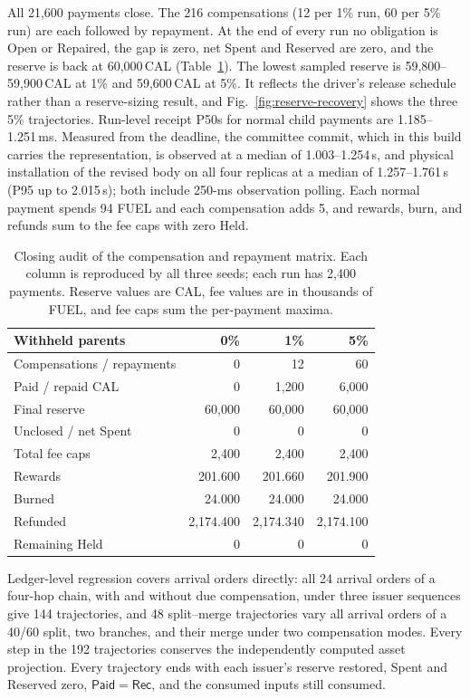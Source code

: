 All 21,600 payments close. The 216 compensations (12 per 1\% run, 60 per 5\%
run) are each followed by repayment. At the end of every run no obligation is
Open or Repaired, the gap is zero, net Spent and Reserved are zero, and the
reserve is back at 60,000\,CAL (Table~\ref{archive:tab:eval-audit}). The lowest
sampled reserve is 59,800--59,900\,CAL at 1\% and 59,600\,CAL at 5\%. It
reflects the driver's release schedule rather than a reserve-sizing result,
and Fig.~\ref{fig:reserve-recovery} shows the three 5\% trajectories. Run-level receipt P50s
for normal child payments are 1.185--1.251\,ms. Measured from the deadline, the
committee commit, which in this build carries the representation, is observed
at a median of 1.003--1.254\,s, and physical installation of the revised
body on all four replicas at a median of 1.257--1.761\,s (P95 up to 2.015\,s); both include 250-ms observation
polling. Each normal payment spends 94 FUEL and each compensation adds 5, and
rewards, burn, and refunds sum to the fee caps with zero Held.

\begin{table}[t]
  \caption{Closing audit of the compensation and repayment matrix. Each
    column is reproduced by all three seeds; each run has 2,400 payments.
    Reserve values are CAL, fee values are in thousands of FUEL, and fee
    caps sum the per-payment maxima.}
  \label{archive:tab:eval-audit}
  \centering
  \small
  \begin{tabular}{@{}lrrr@{}}
    \toprule
    Withheld parents & 0\% & 1\% & 5\% \\
    \midrule
    Compensations / repayments & 0 & 12 & 60 \\
    Paid / repaid CAL & 0 & 1,200 & 6,000 \\
    Final reserve & 60,000 & 60,000 & 60,000 \\
    Unclosed / net Spent & 0 & 0 & 0 \\
    Total fee caps & 2,400 & 2,400 & 2,400 \\
    Rewards & 201.600 & 201.660 & 201.900 \\
    Burned & 24.000 & 24.000 & 24.000 \\
    Refunded & 2,174.400 & 2,174.340 & 2,174.100 \\
    Remaining Held & 0 & 0 & 0 \\
    \bottomrule
  \end{tabular}
\end{table}

Ledger-level regression covers arrival orders directly: all 24 arrival orders
of a four-hop chain, with and without due compensation, under three issuer
sequences give 144 trajectories, and 48 split--merge trajectories vary all
arrival orders of a 40/60 split, two branches, and their merge under two
compensation modes. Every step in the 192 trajectories conserves the
independently computed asset projection. Every trajectory ends with each
issuer's reserve restored, Spent and Reserved zero, $\mathsf{Paid}=\mathsf{Rec}$,
and the consumed inputs still consumed.

